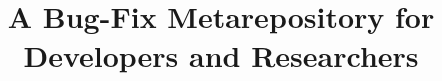 \documentclass{sig-alternate-05-2015}
\begin{document}






%

\title{A Bug-Fix Metarepository for Developers and
Researchers}
%
%
%
%
%
\end{document}
